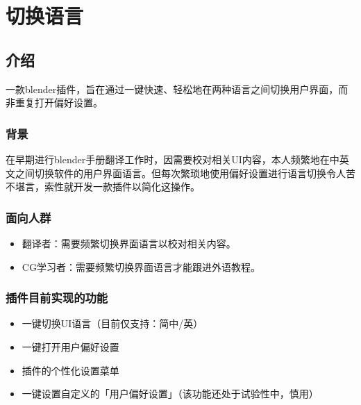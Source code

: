 \documentclass{../../PublicResources/DocClass}
\begin{document}
    \maketitle
    \frontmatter
    \clearpage
    
    \clearpage
    {\centering \tableofcontents} %
    \mainmatter

    \chapter{切换语言}
    \section{介绍}
    一款blender插件，旨在通过一键快速、轻松地在两种语言之间切换用户界面，而非重复打开偏好设置。

    \subsection{背景}
    在早期进行blender手册翻译工作时，因需要校对相关UI内容，本人频繁地在中英文之间切换软件的用户界面语言。但每次繁琐地使用偏好设置进行语言切换令人苦不堪言，索性就开发一款插件以简化这操作。

    \subsection{面向人群}
    \begin{itemize}
        \item 翻译者：需要频繁切换界面语言以校对相关内容。
        \item CG学习者：需要频繁切换界面语言才能跟进外语教程。
    \end{itemize}

    \subsection{插件目前实现的功能}
    \begin{itemize}
        \item 一键切换UI语言（目前仅支持：简中/英）
        \item 一键打开用户偏好设置
        \item 插件的个性化设置菜单
        \item 一键设置自定义的「用户偏好设置」（{\color{red}该功能还处于试验性中，慎用}）
    \end{itemize}
\end{document}
